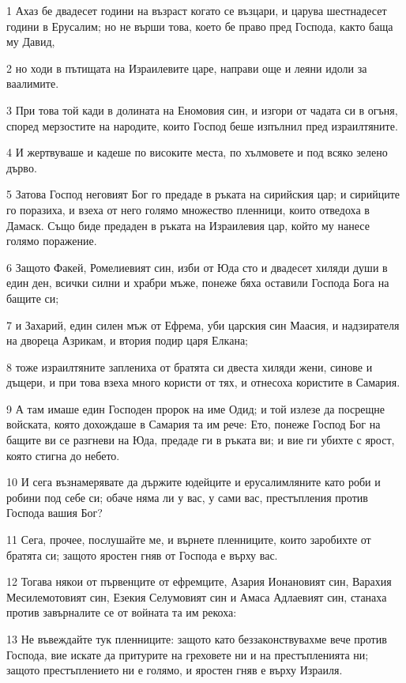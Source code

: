 \par 1 Ахаз бе двадесет години на възраст когато се възцари, и царува шестнадесет години в Ерусалим; но не върши това, което бе право пред Господа, както баща му Давид,
\par 2 но ходи в пътищата на Израилевите царе, направи още и леяни идоли за ваалимите.
\par 3 При това той кади в долината на Еномовия син, и изгори от чадата си в огъня, според мерзостите на народите, които Господ беше изпълнил пред израилтяните.
\par 4 И жертвуваше и кадеше по високите места, по хълмовете и под всяко зелено дърво.
\par 5 Затова Господ неговият Бог го предаде в ръката на сирийския цар; и сирийците го поразиха, и взеха от него голямо множество пленници, които отведоха в Дамаск. Също биде предаден в ръката на Израилевия цар, който му нанесе голямо поражение.
\par 6 Защото Факей, Ромелиевият син, изби от Юда сто и двадесет хиляди души в един ден, всички силни и храбри мъже, понеже бяха оставили Господа Бога на бащите си;
\par 7 и Захарий, един силен мъж от Ефрема, уби царския син Маасия, и надзирателя на двореца Азрикам, и втория подир царя Елкана;
\par 8 тоже израилтяните заплениха от братята си двеста хиляди жени, синове и дъщери, и при това взеха много користи от тях, и отнесоха користите в Самария.
\par 9 А там имаше един Господен пророк на име Одид; и той излезе да посрещне войската, която дохождаше в Самария та им рече: Ето, понеже Господ Бог на бащите ви се разгневи на Юда, предаде ги в ръката ви; и вие ги убихте с ярост, която стигна до небето.
\par 10 И сега възнамерявате да държите юдейците и ерусалимляните като роби и робини под себе си; обаче няма ли у вас, у сами вас, престъпления против Господа вашия Бог?
\par 11 Сега, прочее, послушайте ме, и върнете пленниците, които заробихте от братята си; защото яростен гняв от Господа е върху вас.
\par 12 Тогава някои от първенците от ефремците, Азария Ионановият син, Варахия Месилемотовият син, Езекия Селумовият син и Амаса Адлаевият син, станаха против завърналите се от войната та им рекоха:
\par 13 Не въвеждайте тук пленниците: защото като беззаконствувахме вече против Господа, вие искате да притурите на греховете ни и на престъпленията ни; защото престъплението ни е голямо, и яростен гняв е върху Израиля.
